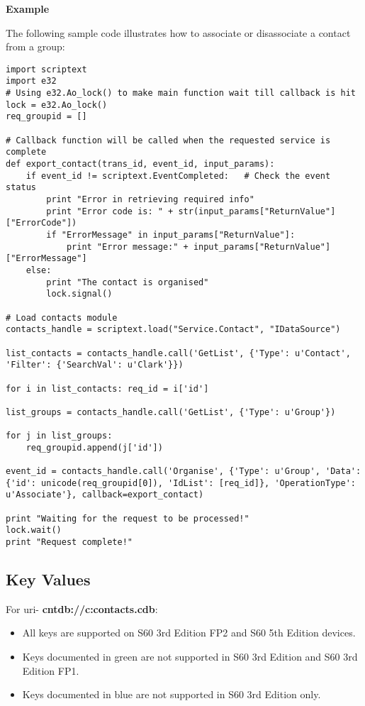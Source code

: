 {\bf Example} \break

The following sample code illustrates how to associate or disassociate a contact from a group:

\begin{verbatim}
import scriptext
import e32
# Using e32.Ao_lock() to make main function wait till callback is hit
lock = e32.Ao_lock()
req_groupid = []

# Callback function will be called when the requested service is complete
def export_contact(trans_id, event_id, input_params):
    if event_id != scriptext.EventCompleted:   # Check the event status
        print "Error in retrieving required info"
        print "Error code is: " + str(input_params["ReturnValue"]["ErrorCode"])
        if "ErrorMessage" in input_params["ReturnValue"]:
            print "Error message:" + input_params["ReturnValue"]["ErrorMessage"]
    else:
        print "The contact is organised"
        lock.signal()

# Load contacts module
contacts_handle = scriptext.load("Service.Contact", "IDataSource")

list_contacts = contacts_handle.call('GetList', {'Type': u'Contact', 'Filter': {'SearchVal': u'Clark'}})

for i in list_contacts: req_id = i['id']

list_groups = contacts_handle.call('GetList', {'Type': u'Group'})

for j in list_groups:
    req_groupid.append(j['id'])

event_id = contacts_handle.call('Organise', {'Type': u'Group', 'Data': {'id': unicode(req_groupid[0]), 'IdList': [req_id]}, 'OperationType': u'Associate'}, callback=export_contact)

print "Waiting for the request to be processed!"
lock.wait()
print "Request complete!"
\end{verbatim}

\subsection{Key Values}
\label{subsec:contactkeyval}

For uri- {\bf cntdb://c:contacts.cdb}:

\begin{itemize}
\item All keys are supported on S60 3rd Edition FP2 and S60 5th Edition devices.
\item Keys documented in {\color{green}green} are not supported in S60 3rd Edition and S60 3rd Edition FP1.
\item Keys documented in {\color{blue}blue} are not supported in S60 3rd Edition only.
\end{itemize}


